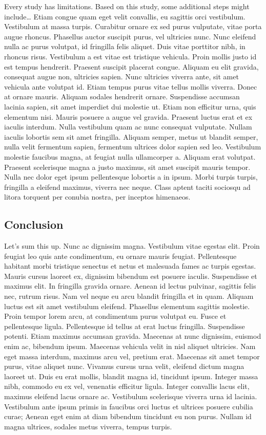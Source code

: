 \documentclass[
  man,
  floatsintext,
  longtable,
  nolmodern,
  notxfonts,
  notimes,
  mask,
  colorlinks=true,linkcolor=blue,citecolor=blue,urlcolor=blue]{apa7}
\begin{document}
Every study has limitations. Based on this study, some additional steps
might include\ldots{} Etiam congue quam eget velit convallis, eu
sagittis orci vestibulum. Vestibulum at massa turpis. Curabitur ornare
ex sed purus vulputate, vitae porta augue rhoncus. Phasellus auctor
suscipit purus, vel ultricies nunc. Nunc eleifend nulla ac purus
volutpat, id fringilla felis aliquet. Duis vitae porttitor nibh, in
rhoncus risus. Vestibulum a est vitae est tristique vehicula. Proin
mollis justo id est tempus hendrerit. Praesent suscipit placerat congue.
Aliquam eu elit gravida, consequat augue non, ultricies sapien. Nunc
ultricies viverra ante, sit amet vehicula ante volutpat id. Etiam tempus
purus vitae tellus mollis viverra. Donec at ornare mauris. Aliquam
sodales hendrerit ornare. Suspendisse accumsan lacinia sapien, sit amet
imperdiet dui molestie ut. Etiam non efficitur urna, quis elementum
nisi. Mauris posuere a augue vel gravida. Praesent luctus erat et ex
iaculis interdum. Nulla vestibulum quam ac nunc consequat vulputate.
Nullam iaculis lobortis sem sit amet fringilla. Aliquam semper, metus ut
blandit semper, nulla velit fermentum sapien, fermentum ultrices dolor
sapien sed leo. Vestibulum molestie faucibus magna, at feugiat nulla
ullamcorper a. Aliquam erat volutpat. Praesent scelerisque magna a justo
maximus, sit amet suscipit mauris tempor. Nulla nec dolor eget ipsum
pellentesque lobortis a in ipsum. Morbi turpis turpis, fringilla a
eleifend maximus, viverra nec neque. Class aptent taciti sociosqu ad
litora torquent per conubia nostra, per inceptos himenaeos.

\subsection{Conclusion}\label{conclusion}

Let's sum this up. Nunc ac dignissim magna. Vestibulum vitae egestas
elit. Proin feugiat leo quis ante condimentum, eu ornare mauris feugiat.
Pellentesque habitant morbi tristique senectus et netus et malesuada
fames ac turpis egestas. Mauris cursus laoreet ex, dignissim bibendum
est posuere iaculis. Suspendisse et maximus elit. In fringilla gravida
ornare. Aenean id lectus pulvinar, sagittis felis nec, rutrum risus. Nam
vel neque eu arcu blandit fringilla et in quam. Aliquam luctus est sit
amet vestibulum eleifend. Phasellus elementum sagittis molestie. Proin
tempor lorem arcu, at condimentum purus volutpat eu. Fusce et
pellentesque ligula. Pellentesque id tellus at erat luctus fringilla.
Suspendisse potenti. Etiam maximus accumsan gravida. Maecenas at nunc
dignissim, euismod enim ac, bibendum ipsum. Maecenas vehicula velit in
nisl aliquet ultricies. Nam eget massa interdum, maximus arcu vel,
pretium erat. Maecenas sit amet tempor purus, vitae aliquet nunc.
Vivamus cursus urna velit, eleifend dictum magna laoreet ut. Duis eu
erat mollis, blandit magna id, tincidunt ipsum. Integer massa nibh,
commodo eu ex vel, venenatis efficitur ligula. Integer convallis lacus
elit, maximus eleifend lacus ornare ac. Vestibulum scelerisque viverra
urna id lacinia. Vestibulum ante ipsum primis in faucibus orci luctus et
ultrices posuere cubilia curae; Aenean eget enim at diam bibendum
tincidunt eu non purus. Nullam id magna ultrices, sodales metus viverra,
tempus turpis.
\end{document}
